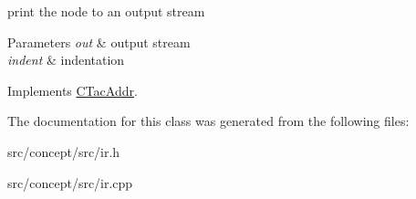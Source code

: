 print the node to an output stream 


\begin{DoxyParams}{Parameters}
{\em out} & output stream \\
\hline
{\em indent} & indentation \\
\hline
\end{DoxyParams}


Implements \hyperlink{classCTacAddr_a5133c77d5721bb174a4e5a5ab26d5a0d}{C\-Tac\-Addr}.



The documentation for this class was generated from the following files\-:\begin{DoxyCompactItemize}
\item 
src/concept/src/ir.\-h\item 
src/concept/src/ir.\-cpp\end{DoxyCompactItemize}
